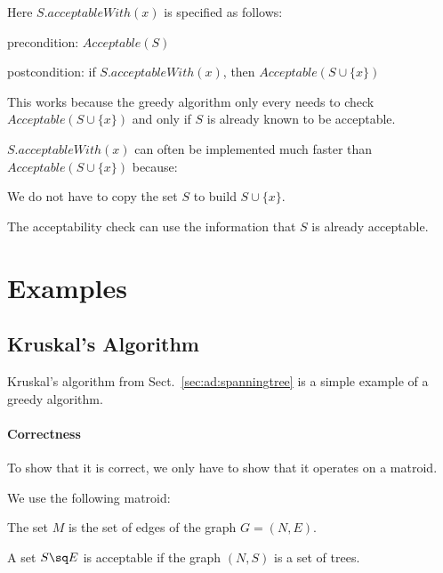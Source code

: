 Here $S.acceptableWith(x)$ is specified as follows:
\begin{compactitem}
 \item precondition: $Acceptable(S)$
 \item postcondition: if $S.acceptableWith(x)$, then $Acceptable(S\cup\{x\})$
\end{compactitem}
This works because the greedy algorithm only every needs to check $Acceptable(S\cup\{x\})$ and only if $S$ is already known to be acceptable.

$S.acceptableWith(x)$ can often be implemented much faster than $Acceptable(S\cup\{x\})$ because:
\begin{compactitem}
 \item We do not have to copy the set $S$ to build $S\cup\{x\}$.
 \item The acceptability check can use the information that $S$ is already acceptable.
\end{compactitem}

\section{Examples}

\subsection{Kruskal's Algorithm}

Kruskal's algorithm from Sect.~\ref{sec:ad:spanningtree} is a simple example of a greedy algorithm.

\paragraph{Correctness}
To show that it is correct, we only have to show that it operates on a matroid.

We use the following matroid:
\begin{compactitem}
 \item The set $M$ is the set of edges of the graph $G=(N,E)$.
 \item A set $S\sq E$ is acceptable if the graph $(N,S)$ is a set of trees.
\end{compactitem}

